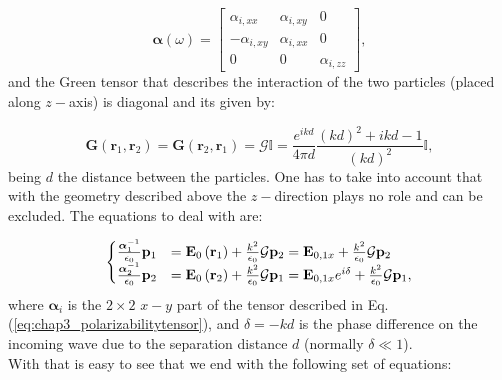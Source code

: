 \begin{equation}
\boldsymbol{\alpha}\left(\omega\right)=\left[\begin{array}{ccc}
\alpha_{i,xx} & \alpha_{i,xy} & 0\\
-\alpha_{i,xy} & \alpha_{i,xx}& 0\\
0 & 0 & \alpha_{i,zz}
\end{array}\right],\label{eq:chap3_polarizabilitytensor}
\end{equation}
and the Green tensor that describes the interaction of the two particles (placed along $z-$axis) is diagonal and its given by:

\begin{equation}
\mathbf{G}\left(\mathbf{r}_1,\mathbf{r}_2\right) = \mathbf{G}\left(\mathbf{r}_2,\mathbf{r}_1\right) = \mathcal{G}\mathbb{I}=\frac{e^{ikd}}{4\pi d}\frac{\left(kd\right)^2+ikd-1}{\left(kd\right)^2}\mathbb{I},\label{eq:chap3_greenf}
\end{equation}
being $d$ the distance between the particles. One has to take into account that with the geometry described above the $z-$direction plays no role and can be excluded. The equations to deal with are:

\begin{equation}
\begin{cases}
\frac{\boldsymbol{\alpha}_{1}^{-1}}{\epsilon_0} \bold{p}_1 & = \bold{E}_0\left(\bold{r}_1\right) + \frac{k^2}{\epsilon_0}\mathcal{G}\bold{p}_2 =  \bold{E}_{0,1x}+\frac{k^2}{\epsilon_0}\mathcal{G}\bold{p}_2\\
\frac{\boldsymbol{\alpha}_{2}^{-1}}{\epsilon_0} \bold{p}_2 & = \bold{E}_0\left(\bold{r}_2\right) + \frac{k^2}{\epsilon_0}\mathcal{G}\bold{p}_1 =  \bold{E}_{0,1x}e^{i\delta}+\frac{k^2}{\epsilon_0}\mathcal{G}\bold{p}_1,
\end{cases}\label{eq:app_syspol}
\end{equation}
where $\boldsymbol{\alpha}_i$ is the $2\times2$ $x-y$ part of the tensor described in Eq. (\ref{eq:chap3_polarizabilitytensor}), and $\delta = -kd$ is the phase difference on the incoming wave due to the separation distance $d$ (normally $\delta \ll 1$).\\
With that is easy to see that we end with the following set of equations:

